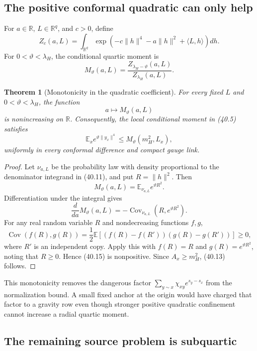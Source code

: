 \documentclass[11pt]{article}
\newtheorem{theorem}{Theorem}[section]
\theoremstyle{remark}
\begin{document}
\subsection{The positive conformal quadratic can only help}

For \(a\in\mathbb R\), \(L\in\mathbb R^q\), and \(c>0\), define
\[
 Z_c(a,L)=\int_{\mathbb R^q}
 \exp\left(-c\|h\|^4-a\|h\|^2+\langle L,h\rangle\right)dh.    \tag{40.10}
\]
For \(0<\vartheta<\lambda_H\), the conditional quartic moment is
\[
 M_\vartheta(a,L)
 =\frac{Z_{\lambda_H-\vartheta}(a,L)}
 {Z_{\lambda_H}(a,L)}.                            \tag{40.11}
\]

\begin{theorem}[Monotonicity in the quadratic coefficient]
\label{thm:v17v40-monotone}
For every fixed \(L\) and
\(0<\vartheta<\lambda_H\), the function
\[
 a\longmapsto M_\vartheta(a,L)                    \tag{40.12}
\]
is nonincreasing on \(\mathbb R\).  Consequently, the local conditional
moment in (40.5) satisfies
\[
 \boxed{
 \mathbb E_xe^{\vartheta\|y_x\|^4}
 \leq M_\vartheta(m_H^2,L_x),}                    \tag{40.13}
\]
uniformly in every conformal difference and compact gauge link.
\end{theorem}

\begin{proof}
Let \(\nu_{a,L}\) be the probability law with density proportional to
the denominator integrand in (40.11), and put \(R=\|h\|^2\).  Then
\[
 M_\vartheta(a,L)=\mathbb E_{\nu_{a,L}}e^{\vartheta R^2}.       \tag{40.14}
\]
Differentiation under the integral gives
\[
 \frac{d}{da}M_\vartheta(a,L)
 =-\operatorname{Cov}_{\nu_{a,L}}
 \left(R,e^{\vartheta R^2}\right).                \tag{40.15}
\]
For any real random variable \(R\) and nondecreasing functions
\(f,g\),
\[
 \operatorname{Cov}(f(R),g(R))
 =\frac12\mathbb E\left[
 (f(R)-f(R'))(g(R)-g(R'))
 \right]\geq0,                                    \tag{40.16}
\]
where \(R'\) is an independent copy.  Apply this with
\(f(R)=R\) and \(g(R)=e^{\vartheta R^2}\), noting that
\(R\geq0\).  Hence (40.15) is nonpositive.  Since
\(A_x\geq m_H^2\), (40.13) follows.
\end{proof}

This monotonicity removes the dangerous factor
\(\sum_{y\sim x}\chi_{xy}e^{s_y-s_x}\) from the normalization bound.
A small fixed anchor at the origin would have charged that factor to a
gravity row even though stronger positive quadratic confinement cannot
increase a radial quartic moment.

\subsection{The remaining source problem is subquartic}
\end{document}
